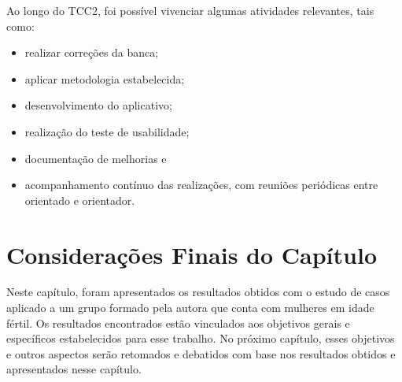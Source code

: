 Ao longo do TCC2, foi possível vivenciar algumas atividades relevantes, tais como:

\begin{itemize}
    \item realizar correções da banca;
    \item aplicar metodologia estabelecida;
    \item desenvolvimento do aplicativo;
    \item realização do teste de usabilidade;
    \item documentação de melhorias e
    \item acompanhamento contínuo das realizações, com reuniões periódicas entre orientado e orientador.
\end{itemize}

\section{Considerações Finais do Capítulo}
Neste capítulo, foram apresentados os resultados obtidos com o estudo de casos aplicado a um grupo formado pela autora que conta com 
mulheres em idade fértil. Os resultados encontrados
estão vinculados aos objetivos gerais e específicos estabelecidos para esse trabalho. No próximo capítulo,
esses objetivos e outros aspectos serão retomados e debatidos com base nos resultados
obtidos e apresentados nesse capítulo.
